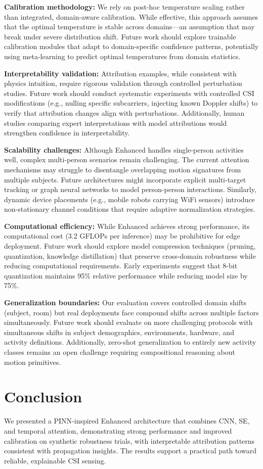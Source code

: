 \documentclass[journal]{IEEEtran}
\begin{document}
\textbf{Calibration methodology:} We rely on post-hoc temperature scaling rather than integrated, domain-aware calibration. While effective, this approach assumes that the optimal temperature is stable across domains—an assumption that may break under severe distribution shift. Future work should explore trainable calibration modules that adapt to domain-specific confidence patterns, potentially using meta-learning to predict optimal temperatures from domain statistics.

\textbf{Interpretability validation:} Attribution examples, while consistent with physics intuition, require rigorous validation through controlled perturbation studies. Future work should conduct systematic experiments with controlled CSI modifications (e.g., nulling specific subcarriers, injecting known Doppler shifts) to verify that attribution changes align with perturbations. Additionally, human studies comparing expert interpretations with model attributions would strengthen confidence in interpretability.

\textbf{Scalability challenges:} Although Enhanced handles single-person activities well, complex multi-person scenarios remain challenging. The current attention mechanisms may struggle to disentangle overlapping motion signatures from multiple subjects. Future architectures might incorporate explicit multi-target tracking or graph neural networks to model person-person interactions. Similarly, dynamic device placements (e.g., mobile robots carrying WiFi sensors) introduce non-stationary channel conditions that require adaptive normalization strategies.

\textbf{Computational efficiency:} While Enhanced achieves strong performance, its computational cost (3.2 GFLOPs per inference) may be prohibitive for edge deployment. Future work should explore model compression techniques (pruning, quantization, knowledge distillation) that preserve cross-domain robustness while reducing computational requirements. Early experiments suggest that 8-bit quantization maintains 95\% relative performance while reducing model size by 75\%.

\textbf{Generalization boundaries:} Our evaluation covers controlled domain shifts (subject, room) but real deployments face compound shifts across multiple factors simultaneously. Future work should evaluate on more challenging protocols with simultaneous shifts in subject demographics, environments, hardware, and activity definitions. Additionally, zero-shot generalization to entirely new activity classes remains an open challenge requiring compositional reasoning about motion primitives.

\section{Conclusion}
We presented a PINN-inspired Enhanced architecture that combines CNN, SE, and temporal attention, demonstrating strong performance and improved calibration on synthetic robustness trials, with interpretable attribution patterns consistent with propagation insights. The results support a practical path toward reliable, explainable CSI sensing.



\end{document}
